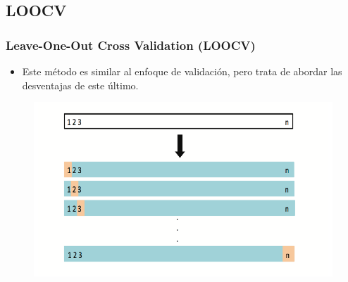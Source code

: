 \documentclass[
  shownotes,
  xcolor={svgnames},
  hyperref={colorlinks,citecolor=DarkBlue,linkcolor=DarkRed,urlcolor=DarkBlue}
  , aspectratio=169]{beamer}
\begin{document}
\subsection{LOOCV}
\begin{frame}[fragile]
\frametitle{Leave-One-Out Cross Validation (LOOCV)}

\begin{itemize}
\item Este método es similar al enfoque de validación, pero trata de abordar las desventajas de este último. 
\end{itemize}

 \begin{figure}[H] \centering
            \captionsetup{justification=centering}
              \includegraphics[scale=0.7]{figures/fig53.png}
       \end{figure}


\end{frame}
\end{document}
